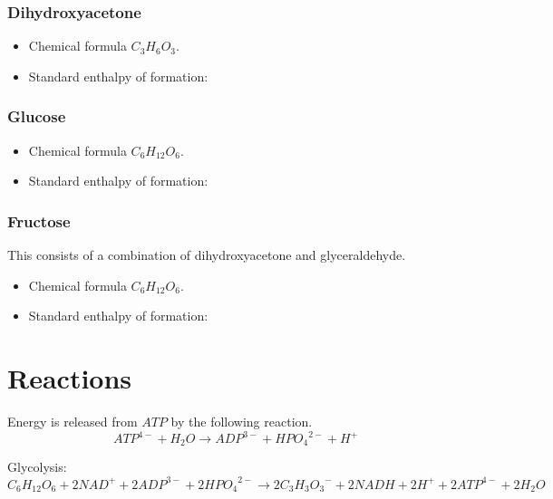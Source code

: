 \documentclass{article}
\begin{document}
\subsubsection{Dihydroxyacetone}
\begin{itemize}
    \item Chemical formula $C_3H_6O_3$.
    \item Standard enthalpy of formation:
\end{itemize}

\subsubsection{Glucose}
\begin{itemize}
    \item Chemical formula $C_6H_{12}O_6$.
    \item Standard enthalpy of formation:
\end{itemize}

\subsubsection{Fructose}
This consists of a combination of dihydroxyacetone and glyceraldehyde.

\begin{itemize}
    \item Chemical formula $C_6H_{12}O_6$.
    \item Standard enthalpy of formation:
\end{itemize}



\section{Reactions}\label{sec_reactions}

Energy is released from $ATP$ by the following reaction.
\[
    {ATP}^{4-} + H_2O \rightarrow {ADP}^{3-} + {HPO_4}^{2-} + H^+
\]

Glycolysis:
\[
    C_6H_{12}O_6 + 2{NAD}^+ + 2{ADP}^{3-} + 2{HPO_4}^{2-} \rightarrow
    2{C_3H_3O_3}^- + 2NADH + 2H^+ + 2{ATP}^{4-} + 2H_2O
\]
\end{document}
